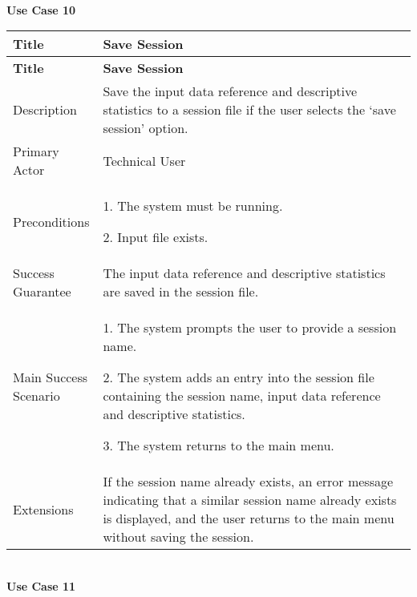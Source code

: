     \pagebreak

    \strut \\
    \textbf{\large Use Case 10}
    
    \begin{longtable}{|p{0.227\linewidth}|p{0.773\linewidth}|}
    \hline
    \textbf{Title} & \textbf{Save Session} \\
    \hline
    \endfirsthead
    \hline
    \textbf{Title} & \textbf{Save Session} \\
    \hline
    \endhead
    \hline
    \endfoot
    \hline
    \endlastfoot
    Description & Save the input data reference and descriptive statistics
    to a session file if the user selects the `save session' option. \\ \hline
    Primary Actor & Technical User \\ \hline
    Preconditions & 1. The system must be running.
    
    2. Input file exists. \\ \hline
    Success Guarantee & The input data reference and descriptive statistics
    are saved in the session file. \\ \hline
    Main Success Scenario & 1. The system prompts the user to provide a
    session name.
    
    2. The system adds an entry into the session file containing the session
    name, input data reference and descriptive statistics.
    
    3. The system returns to the main menu. \\ \hline
    Extensions & If the session name already exists, an error message
    indicating that a similar session name already exists is displayed, and
    the user returns to the main menu without saving the session. \\
    \hline
    \end{longtable}

    \strut \\
    \textbf{\large Use Case 11}
    
